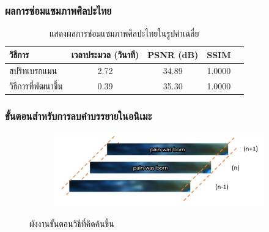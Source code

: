 \documentclass[xcolor=dvipsnames, xetex,serif]{beamer}
\numberwithin{equation}{section}
\begin{document}
	\begin{frame}
		\frametitle{ผลการซ่อมแซมภาพศิลปะไทย}
		\begin{table}[H]
			\centering
			\begin{tabular}[ht]{|l|c|c|c|c|}
				\hline
				วิธีการ  & เวลาประมวล  (วินาที) & PSNR (dB) & SSIM \\
				\hline
				สปริทเบรกแมน & 2.72 & 34.89 & 1.0000 \\ 
				วิธีการที่พัฒนาขึ้น & 0.39 & 35.30 & 1.0000 \\
				\hline
			\end{tabular}
			\caption{แสดงผลการซ่อมแซมภาพศิลปะไทยในรูปค่าเฉลี่ย}
			\label{result:table-thaiart-summary}
		\end{table}	
	\end{frame}
	\begin{frame}
		\frametitle{ขั้นตอนสำหรับการลบคำบรรยายในอนิเมะ}
		\begin{figure}[H]
			\centering
			\begin{subfigure}{0.8\linewidth}
				\centering
				\includegraphics[width=1\linewidth]{images/method_anime/frame_sequence.png}
			\end{subfigure}
			\caption{ผังงานขั้นตอนวิธีที่คิดค้นขึ้น}
		\end{figure}
	\end{frame}
\end{document}
